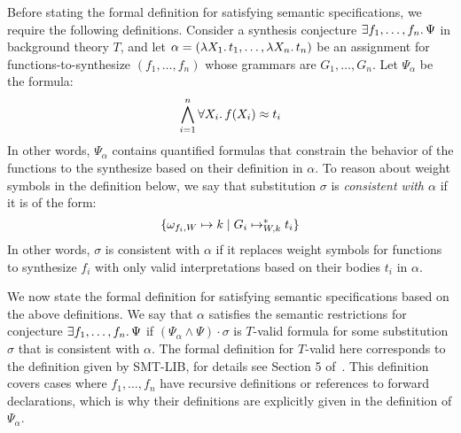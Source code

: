 \documentclass[english,a4paper,10pt]{article}
\begin{document}
Before stating the formal definition for satisfying semantic specifications,
we require the following definitions.
Consider a synthesis conjecture $\exists f_1, \ldots, f_n \ldotp\Psi$
in background theory $T$, and let
$\alpha = ( \lambda X_1 \ldotp t_1, \ldots, \lambda X_n \ldotp t_n)$
be an assignment for functions-to-synthesize $( f_1, \ldots, f_n )$
whose grammars are $G_1, \ldots, G_n$.
Let $\Psi_{\alpha}$ be the formula:
\[
\bigwedge_{i=1}^{n} \forall X_i\ldotp f( X_i ) \approx t_i
\]
In other words, $\Psi_{\alpha}$ contains quantified formulas
that constrain the behavior of the functions to the synthesize
based on their definition in $\alpha$.
To reason about weight symbols in the definition below,
we say that substitution $\sigma$ is \emph{consistent with $\alpha$} if
it is of the form:
\[
\{ \omega_{f_i,W} \mapsto k \mid G_i \mapsto_{W,k}^{\ast} t_i \}
\]
In other words, $\sigma$ is consistent with $\alpha$ if it replaces
weight symbols for functions to synthesize $f_i$
with only valid interpretations based on their bodies $t_i$ in $\alpha$.

We now state the formal definition for satisfying semantic specifications
based on the above definitions.
We say that $\alpha$
satisfies the semantic restrictions for conjecture
$\exists f_1, \ldots, f_n \ldotp\Psi$
if $(\Psi_{\alpha} \wedge \Psi) \cdot \sigma$ is $T$-valid formula
for some substitution $\sigma$ that is consistent with $\alpha$.
The formal definition for $T$-valid here
corresponds to the definition given by SMT-LIB,
for details see Section 5 of~\cite{BarFT-RR-17}.
This definition covers cases where $f_1, \ldots, f_n$
have recursive definitions or references to forward declarations,
which is why their definitions are explicitly given in the definition of
$\Psi_{\alpha}$.
\end{document}
